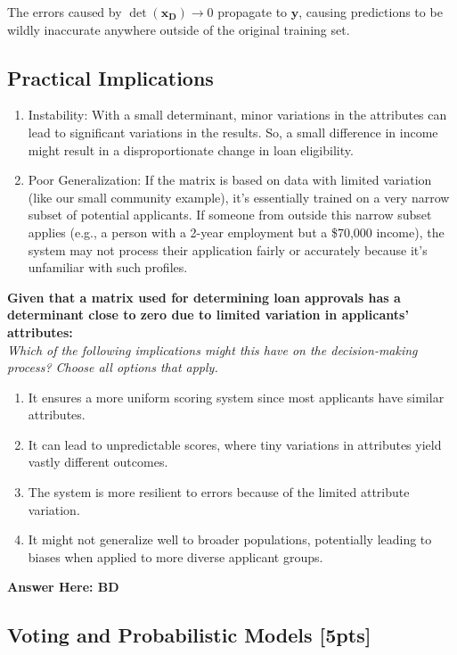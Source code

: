 \documentclass{article}
\begin{document}
The errors caused by $\det(\mathbf{x_D}) \rightarrow 0$ propagate to $\mathbf{y}$, causing predictions to be wildly inaccurate anywhere outside of the original training set.

\subsection*{Practical Implications}

\begin{enumerate}
    \item Instability: With a small determinant, minor variations in the attributes can lead to significant variations in the results. So, a small difference in income might result in a disproportionate change in loan eligibility.
    \item Poor Generalization: If the matrix is based on data with limited variation (like our small community example), it's essentially trained on a very narrow subset of potential applicants. If someone from outside this narrow subset applies (e.g., a person with a 2-year employment but a \$70,000 income), the system may not process their application fairly or accurately because it's unfamiliar with such profiles.
\end{enumerate}

\noindent
\textbf{Given that a matrix used for determining loan approvals has a determinant close to zero due to limited variation in applicants' attributes:} \\
\textit{Which of the following implications might this have on the decision-making process? Choose all options that apply.}
\begin{enumerate}[label=\Alph*)]
    \item It ensures a more uniform scoring system since most applicants have similar attributes.
    \item It can lead to unpredictable scores, where tiny variations in attributes yield vastly different outcomes.
    \item The system is more resilient to errors because of the limited attribute variation.
    \item It might not generalize well to broader populations, potentially leading to biases when applied to more diverse applicant groups.
\end{enumerate}
\textbf{Answer Here: BD}

\newpage

\subsection{Voting and Probabilistic Models [5pts]}
\end{document}
